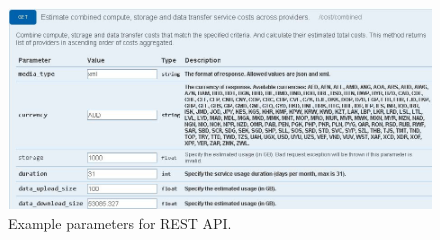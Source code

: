 \begin{figure}
  \includegraphics[width=\textwidth,keepaspectratio]{Figures/system/CloudRecommender/YelpCaseStudy.jpg}
  \caption{Example parameters for REST API.}
  \label{fig:YelpCaseStudy}
\end{figure}

% 
